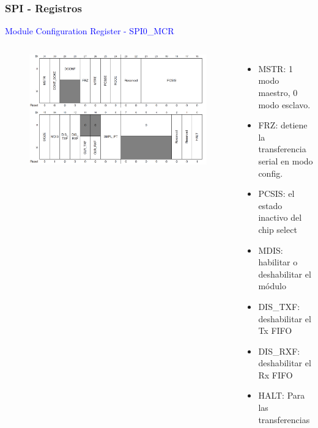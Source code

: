 \documentclass[10.5pt,scale=1.0,t,aspectratio=169,hyperref={pdfpagelabels=false}]{beamer}
\begin{document}
\begin{frame}
	\frametitle{SPI - Registros}
	{\small
	\textcolor{blue}{Module Configuration Register - SPI0\_MCR}
	
	\begin{columns}
		\begin{figure}
			\centering
			\includegraphics[scale=0.2]{13_SPIMCR}
		\end{figure}
	
		\begin{itemize}
			\item MSTR: 1 modo maestro, 0 modo esclavo.
			\item FRZ: detiene la transferencia serial en modo config.
			\item PCSIS: el estado inactivo del chip select
			\item MDIS: habilitar o deshabilitar el módulo
			\item DIS\_TXF: deshabilitar el Tx FIFO
			\item DIS\_RXF: deshabilitar el Rx FIFO
			\item HALT: Para las transferencias
		\end{itemize}
	\end{columns}
	}
\end{frame}
\end{document}
